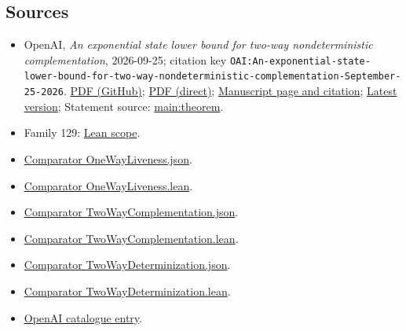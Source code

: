 \documentclass[11pt]{article}
\begin{document}
\subsection{Sources}
\begin{itemize}
\item OpenAI, \emph{An exponential state lower bound for two-way nondeterministic complementation}, 2026-09-25; citation key \texttt{OAI:An-exponential-state-lower-bound-for-two-way-nondeterministic-complementation-September-25-2026}. \href{https://github.com/openai/math/blob/adc7f1241b42e322a6451854ab7e4b4c146bf78a/preprints/An-exponential-state-lower-bound-for-two-way-nondeterministic-complementation-September-25-2026/paper.pdf}{PDF (GitHub)}; \href{https://github.com/openai/math/raw/adc7f1241b42e322a6451854ab7e4b4c146bf78a/preprints/An-exponential-state-lower-bound-for-two-way-nondeterministic-complementation-September-25-2026/paper.pdf}{PDF (direct)}; \href{https://github.com/openai/math/blob/adc7f1241b42e322a6451854ab7e4b4c146bf78a/preprints/An-exponential-state-lower-bound-for-two-way-nondeterministic-complementation-September-25-2026/README.md}{Manuscript page and citation}; \href{https://github.com/openai/math/blob/main/preprints/An-exponential-state-lower-bound-for-two-way-nondeterministic-complementation-September-25-2026/paper.pdf}{Latest version}; Statement source: \href{https://github.com/openai/math/blob/adc7f1241b42e322a6451854ab7e4b4c146bf78a/preprints/An-exponential-state-lower-bound-for-two-way-nondeterministic-complementation-September-25-2026/build/sections/introduction.tex\#L38}{main:theorem}.
\item Family 129: \href{https://github.com/openai/math/blob/adc7f1241b42e322a6451854ab7e4b4c146bf78a/lean/docs/129.md}{Lean scope}.
\item \href{https://github.com/openai/math/blob/adc7f1241b42e322a6451854ab7e4b4c146bf78a/lean/ComparatorChallenges/OneWayLiveness.json}{Comparator OneWayLiveness.json}.
\item \href{https://github.com/openai/math/blob/adc7f1241b42e322a6451854ab7e4b4c146bf78a/lean/ComparatorChallenges/OneWayLiveness.lean}{Comparator OneWayLiveness.lean}.
\item \href{https://github.com/openai/math/blob/adc7f1241b42e322a6451854ab7e4b4c146bf78a/lean/ComparatorChallenges/TwoWayComplementation.json}{Comparator TwoWayComplementation.json}.
\item \href{https://github.com/openai/math/blob/adc7f1241b42e322a6451854ab7e4b4c146bf78a/lean/ComparatorChallenges/TwoWayComplementation.lean}{Comparator TwoWayComplementation.lean}.
\item \href{https://github.com/openai/math/blob/adc7f1241b42e322a6451854ab7e4b4c146bf78a/lean/ComparatorChallenges/TwoWayDeterminization.json}{Comparator TwoWayDeterminization.json}.
\item \href{https://github.com/openai/math/blob/adc7f1241b42e322a6451854ab7e4b4c146bf78a/lean/ComparatorChallenges/TwoWayDeterminization.lean}{Comparator TwoWayDeterminization.lean}.
\item \href{https://github.com/openai/math/blob/adc7f1241b42e322a6451854ab7e4b4c146bf78a/CONTENTS.md}{OpenAI catalogue entry}.
\end{itemize}
\end{document}
